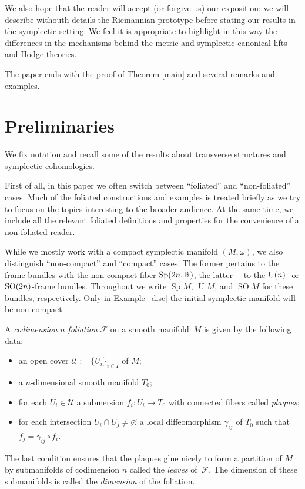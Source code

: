 \documentclass[pdftex]{sigma}
\numberwithin{equation}{section}
\begin{document}
We also hope that the reader will accept (or forgive us) our exposition: we will describe withouth details the Riemannian prototype before stating our results in the symplectic setting. We feel it is appropriate to highlight in this way the differences in the mechanisms behind the metric and symplectic canonical lifts and Hodge theories.

The paper ends with the proof of Theorem \ref{main} and several remarks and examples.

\section{Preliminaries} \label{preliminaries}

We fix notation and recall some of the results about transverse structures and symplectic cohomologies.

First of all, in this paper we often switch between ``foliated'' and ``non-foliated'' cases. Much of the foliated constructions and examples is treated briefly as we try to focus on the topics interesting to the broader audience. At the same time, we include all the relevant foliated definitions and properties for the convenience of a non-foliated reader.

While we mostly work with a compact symplectic manifold $(M,\omega)$, we also distinguish ``non-compact'' and ``compact'' cases. The former pertains to the frame bundles with the non-compact fiber ${\rm Sp}(2n,\mathbb{R})$, the latter~-- to the ${\rm U}(n)$- or ${\rm SO}(2n)$-frame bundles. Throughout we write $\operatorname{Sp} M$, $\operatorname{U} M$, and $\operatorname{SO} M$ for these bundles, respectively. Only in Example~\ref{disc} the initial symplectic manifold will be non-compact.
\begin{Definition} \label{fol}
A \emph{codimension} $n$ \emph{foliation} $\mathcal{F}$ on a smooth manifold~$M$ is given by the following data:
\begin{itemize}\itemsep=0pt
\item an open cover $\mathcal{U}:=\{U_i\}_{i\in I}$ of $M$;
\item a $n$-dimensional smooth manifold $T_0$;
\item for each $U_i\in\mathcal{U}$ a submersion $f_i\colon U_i\longrightarrow T_0$ with connected fibers called \emph{plaques};
\item for each intersection $U_i\cap U_j\neq\varnothing$ a local diffeomorphism $\gamma_{ij}$ of $T_0$ such that $f_j=\gamma_{ij}\circ f_i$.
\end{itemize}
The last condition ensures that the plaques glue nicely to form a partition of $M$ by submanifolds of codimension $n$ called the \emph{leaves} of~$\mathcal{F}$. The dimension of these submanifolds is called the \emph{dimension} of the foliation.
\end{Definition}
\end{document}

